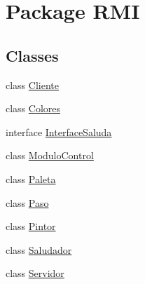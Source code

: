 \hypertarget{namespace_r_m_i}{}\section{Package R\+MI}
\label{namespace_r_m_i}
\subsection*{Classes}
\begin{DoxyCompactItemize}
\item 
class \mbox{\hyperlink{class_r_m_i_1_1_cliente}{Cliente}}
\item 
class \mbox{\hyperlink{class_r_m_i_1_1_colores}{Colores}}
\item 
interface \mbox{\hyperlink{interface_r_m_i_1_1_interface_saluda}{Interface\+Saluda}}
\item 
class \mbox{\hyperlink{class_r_m_i_1_1_modulo_control}{Modulo\+Control}}
\item 
class \mbox{\hyperlink{class_r_m_i_1_1_paleta}{Paleta}}
\item 
class \mbox{\hyperlink{class_r_m_i_1_1_paso}{Paso}}
\item 
class \mbox{\hyperlink{class_r_m_i_1_1_pintor}{Pintor}}
\item 
class \mbox{\hyperlink{class_r_m_i_1_1_saludador}{Saludador}}
\item 
class \mbox{\hyperlink{class_r_m_i_1_1_servidor}{Servidor}}
\end{DoxyCompactItemize}
